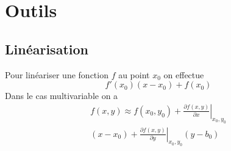 \documentclass[resume]{subfiles}
\begin{document}
\section{Outils}
\subsection{Linéarisation}
Pour linéariser une fonction $f$ au point $x_0$ on effectue
$$f'(x_0)(x-x_0)+f(x_0)$$
Dans le cas multivariable on a
\begin{multline*}
f(x,y) \approx f(x_0,y_0) + \left. {\frac{{\partial f(x,y)}}{{\partial x}}} \right|_{x_0,y_0} \\
(x - x_0) + \left. {\frac{{\partial f(x,y)}}{{\partial y}}} \right|_{x_0,y_0} (y - b_0)
\end{multline*}
\end{document}
